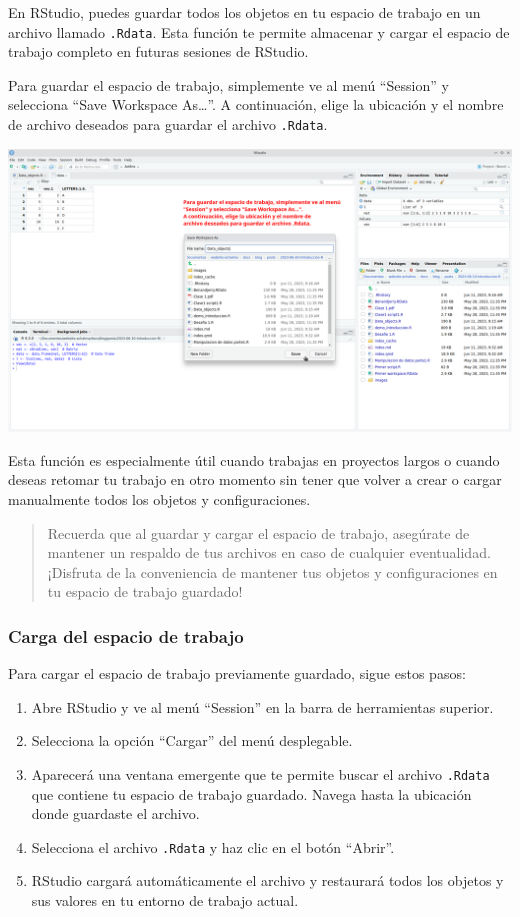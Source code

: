 \documentclass[
  letterpaper,
  DIV=11,
  numbers=noendperiod]{scrartcl}
\providecommand{\tightlist}{%
  \setlength{\itemsep}{0pt}\setlength{\parskip}{0pt}}\usepackage{longtable,booktabs,array}
\begin{document}
En RStudio, puedes guardar todos los objetos en tu espacio de trabajo en
un archivo llamado \texttt{.Rdata}. Esta función te permite almacenar y
cargar el espacio de trabajo completo en futuras sesiones de RStudio.

Para guardar el espacio de trabajo, simplemente ve al menú ``Session'' y
selecciona ``Save Workspace As\ldots{}''. A continuación, elige la
ubicación y el nombre de archivo deseados para guardar el archivo
\texttt{.Rdata}.

\includegraphics{images/Screenshot_20230611_095350.png}

Esta función es especialmente útil cuando trabajas en proyectos largos o
cuando deseas retomar tu trabajo en otro momento sin tener que volver a
crear o cargar manualmente todos los objetos y configuraciones.

\begin{quote}
Recuerda que al guardar y cargar el espacio de trabajo, asegúrate de
mantener un respaldo de tus archivos en caso de cualquier eventualidad.
¡Disfruta de la conveniencia de mantener tus objetos y configuraciones
en tu espacio de trabajo guardado!
\end{quote}

\hypertarget{carga-del-espacio-de-trabajo}{%
\subsubsection{Carga del espacio de
trabajo}\label{carga-del-espacio-de-trabajo}}

Para cargar el espacio de trabajo previamente guardado, sigue estos
pasos:

\begin{enumerate}
\def\labelenumi{\arabic{enumi}.}
\tightlist
\item
  Abre RStudio y ve al menú ``Session'' en la barra de herramientas
  superior.
\item
  Selecciona la opción ``Cargar'' del menú desplegable.
\item
  Aparecerá una ventana emergente que te permite buscar el archivo
  \texttt{.Rdata} que contiene tu espacio de trabajo guardado. Navega
  hasta la ubicación donde guardaste el archivo.
\item
  Selecciona el archivo \texttt{.Rdata} y haz clic en el botón
  ``Abrir''.
\item
  RStudio cargará automáticamente el archivo y restaurará todos los
  objetos y sus valores en tu entorno de trabajo actual.
\end{enumerate}
\end{document}
